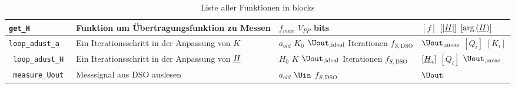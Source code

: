 \documentclass[../Report.tex]{subfiles}
\begin{document}
\begin{table}[H]
\begin{tabular}[t]{| >{\texttt\bgroup}m{3.5cm}<{\egroup}|m{8cm}|m{2cm}|m{2cm}|}
  \hline
  get\_H & Funktion um Übertragungsfunktion zu Messen & $f_{max}$ \newline $V_{PP}$ \newline bits & $[f]$ \newline $[|\underline{H}|]$ \newline $[\arg{(\underline{H})}]$\\
  \hline
  loop\_adust\_a & Ein Iterationsschritt in der Anpassung von $K$ & $a_{old}$ \newline $K_0$ \newline $\Uout_{,\textrm{ideal}}$ \newline Iterationen \newline $f_{S,\textrm{DSO}}$ & $\Uout_{,\textrm{meas}}$ \newline$[Q_i]$ \newline $[K_i]$\\
  \hline
  loop\_adust\_H & Ein Iterationsschritt in der Anpassung von $\underline{H}$ & $H_0$ \newline $K$ \newline $\Uout_{,\textrm{ideal}}$ \newline Iterationen \newline $f_{S,\textrm{DSO}}$ & $[\underline{H}_i]$ \newline $[Q_i]$ \newline $\Uout_{,\textrm{meas}}$\\
  \hline
  measure\_Uout & Messsignal aus DSO auslesen & $a_{old}$ \newline $\Uin$ \newline $f_{S,\textrm{DSO}}$ & $\Uout$\\
  \hline
\end{tabular}
\caption{Liste aller Funktionen in blocks}
\label{tab:anhang.Funktionen.blocks}
\end{table}
\end{document}
